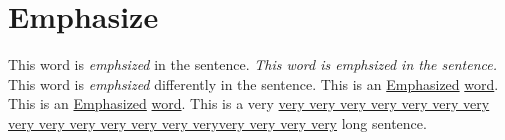 \documentclass{article}
\begin{document}
    \section{Emphasize}
        This word is \emph{emphsized} in the sentence. \newline
        \textit{This word is \emph{emphsized} in the sentence.}\newline 
        This word is \emph{emphsized} differently in the sentence. \newline
        This is an \underline{Emphasized} \underline{word}. \newline
        This is an \uline{Emphasized} \uline{word}. \newline
        This is a very \uline{very very very very very very very very very very 
        very very very veryvery very very very} long sentence. 
\end{document}
